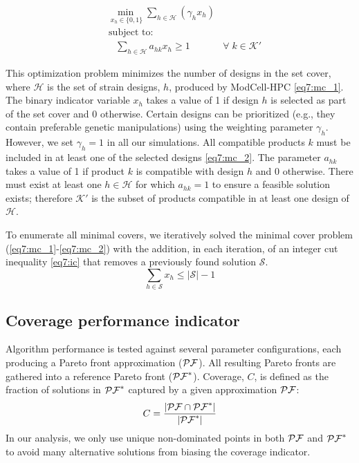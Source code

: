 {\begin{align}
    & \underset{ \;x_h \in \{0,1\}}{\min} \sum_{h \in \mathcal{H}} ( \gamma_h x_h) \label{eq7:mc_1}\\
    & \nonumber \; \text{subject to:} \\
    & \quad \sum_{h \in \mathcal{H}} a_{hk} x_h \ge 1 & \forall \; k \in \mathcal{K'} \label{eq7:mc_2}%
\end{align}

This optimization problem minimizes the number of designs in the set cover, where $\mathcal{H}$ is the set of strain designs, $h$, produced by ModCell-HPC \eqref{eq7:mc_1}.
The binary indicator variable $x_h$ takes a value of 1 if design $h$ is selected as part of the set cover and 0 otherwise.
Certain designs can be prioritized (e.g., they contain preferable genetic manipulations) using the weighting parameter $\gamma_h$. However, we set $\gamma_h = 1$ in all our simulations. All compatible products $k$ must be included in at least one of the selected designs \eqref{eq7:mc_2}. The parameter $a_{hk}$ takes a value of 1 if product $k$ is compatible with design $h$ and 0 otherwise. There must exist at least one $h \in \mathcal{H}$ for which $a_{hk} = 1$ to ensure a feasible solution exists; therefore $\mathcal{K'}$ is the subset of products compatible in at least one design of $\mathcal{H}$.

To enumerate all minimal covers, we iteratively solved the minimal cover problem (\ref{eq7:mc_1}-\ref{eq7:mc_2}) with the addition, in each iteration, of an integer cut inequality \eqref{eq7:ic} that removes a previously found solution $\mathcal{S}$.
\begin{equation}
    \sum_{h\in\mathcal{S}} x_h \le |\mathcal{S}|  - 1 \label{eq7:ic}
\end{equation}

\subsection{Coverage performance indicator} \label{sec:coverage_metric}
Algorithm performance is tested against several parameter configurations, each producing a Pareto front approximation ($\mathcal{PF}$). All resulting Pareto fronts are gathered into a reference Pareto front ($\mathcal{PF}^*$).
Coverage, $C$, is defined as the fraction of solutions in $\mathcal{PF}^*$ captured by a given approximation $\mathcal{PF}$:
\begin{equation}
    C = \frac{|\mathcal{PF} \cap \mathcal{PF}^*|}{|\mathcal{PF}^*|}
\end{equation}
In our analysis, we only use unique non-dominated points in both $\mathcal{PF}$ and $\mathcal{PF}^*$ to avoid many alternative solutions from biasing the coverage indicator.

}
